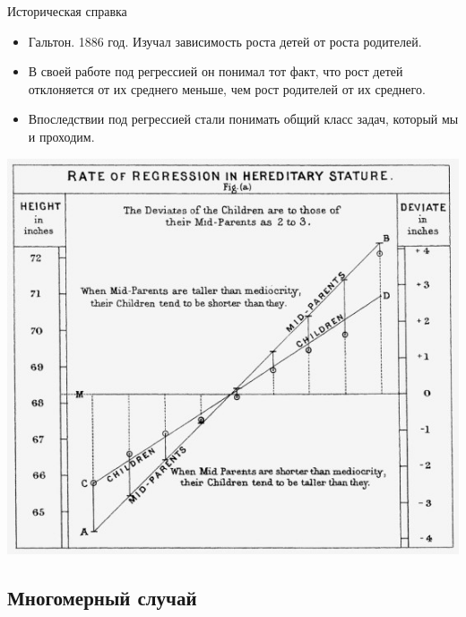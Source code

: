 \documentclass[9pt]{beamer}
\begin{document}
\begin{frame}{Историческая справка}
\begin{itemize}
    \item Гальтон. 1886 год. Изучал зависимость роста детей от роста родителей.
    \item В своей работе под регрессией он понимал тот факт, что рост детей отклоняется от их среднего меньше, чем рост родителей от их среднего.
    \item Впоследствии под регрессией стали понимать общий класс задач, который мы и проходим.
\end{itemize}
\begin{center}
    \includegraphics[height=0.6\textheight]{img/linear_regression_galton.jpg}
\end{center}
\end{frame}

\subsection{Многомерный случай}
\end{document}

